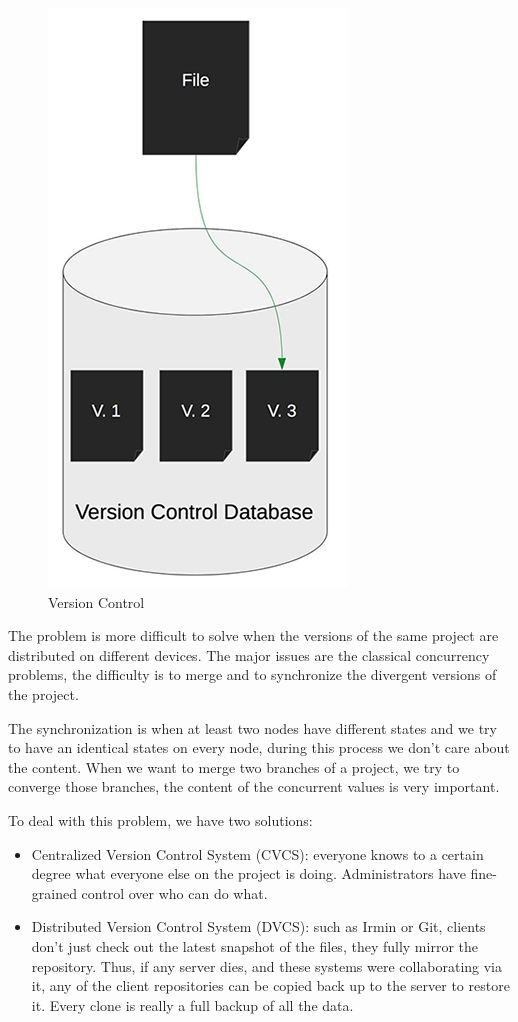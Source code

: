 \documentclass[10pt,a4paper]{report}
\begin{document}
\begin{figure}[H]
\centerline{\includegraphics[scale=0.5]{img/vc.jpg}} 
\caption{Version Control}
\end{figure}

The problem is more difficult to solve when the versions of the same project are distributed on different devices.
The major issues are the classical concurrency problems, the difficulty is to merge and to synchronize the divergent versions of the project.\newline

The synchronization is when at least two nodes have different states and we try to have an identical states on every node, during this process we don't care about the content.
When we want to merge two branches of a project, we try to converge those branches, the content of the concurrent values is very important.

To deal with this problem, we have two solutions:
\begin{itemize}

\item Centralized Version Control System (CVCS): everyone knows to a certain degree what everyone else on the project is doing. Administrators have fine-grained control over who can do what.

\item Distributed Version Control System (DVCS): such as Irmin or Git, clients don't just check out the latest snapshot of the files, they fully mirror the repository. Thus, if any server dies, and these systems were collaborating via it, any of the client repositories can be copied back up to the server to restore it. Every clone is really a full backup of all the data.

\end{itemize}
\end{document}
